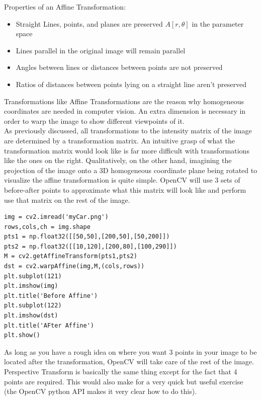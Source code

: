 \documentclass{article}
\begin{document}
Properties of an Affine Transformation: \\
\begin{itemize}
  \item Straight Lines, points, and planes are preserved \begin{math}A[r,\theta]\end{math} in the parameter space
  \item Lines parallel in the original image will remain parallel
  \item Angles between lines or distances between points are not preserved
  \item Ratios of distances between points lying on a straight line aren't preserved
\end{itemize}

Transformations like Affine Transformations are the reason why homogeneous coordinates are needed in computer vision. An extra dimension is necessary in order to warp the image to show different viewpoints of it. \\
As previously discussed, all transformations to the intensity matrix of the image are determined by a transformation matrix. An intuitive grasp of what the transformation matrix would look like is far more difficult with transformations like the ones on the right. Qualitatively, on the other hand,  imagining the projection of the image onto a 3D homogeneous coordinate plane being rotated to visualize the affine transformation is quite simple. OpenCV will use 3 sets of before-after points to approximate what this matrix will look like and perform use that matrix on the rest of the image. \\
\begin{lstlisting}
img = cv2.imread('myCar.png')
rows,cols,ch = img.shape
pts1 = np.float32([[50,50],[200,50],[50,200]])
pts2 = np.float32([[10,120],[200,80],[100,290]])
M = cv2.getAffineTransform(pts1,pts2)
dst = cv2.warpAffine(img,M,(cols,rows))
plt.subplot(121)
plt.imshow(img)
plt.title('Before Affine')
plt.subplot(122)
plt.imshow(dst)
plt.title('AFter Affine')
plt.show()
\end{lstlisting}
As long as you have a rough idea on where you want 3 points in your image to be located after the transformation, OpenCV will take care of the rest of the image. Perspective Transform is basically the same thing except for the fact that 4 points are required. This would also make for a very quick but useful exercise (the OpenCV python API makes it very clear how to do this).
\end{document}

